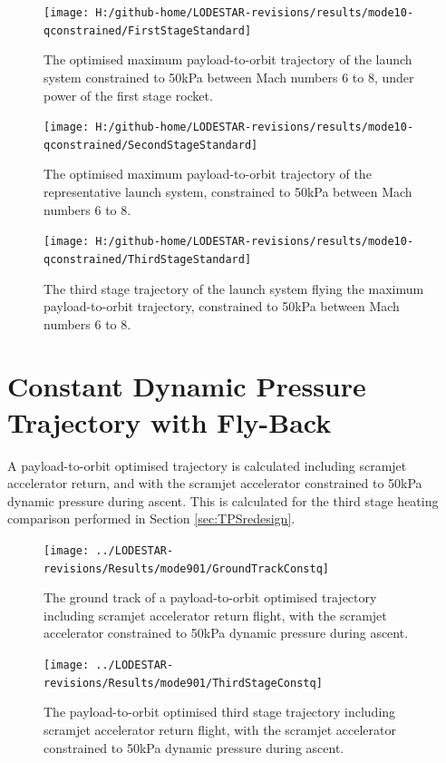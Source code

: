 \begin{figure}[th]
\centering
\texttt{[image: H:/github-home/LODESTAR-revisions/results/mode10-qconstrained/FirstStageStandard]}
\caption{The optimised maximum payload-to-orbit trajectory of the launch system constrained to 50kPa between Mach numbers 6 to 8, under power of the first stage rocket.}
\label{fig:FirstStageqConstrained68}
\end{figure}
		
\begin{figure}[th]
\centering
\texttt{[image: H:/github-home/LODESTAR-revisions/results/mode10-qconstrained/SecondStageStandard]}
\caption{The optimised maximum payload-to-orbit trajectory of the representative launch system, constrained to 50kPa between Mach numbers 6 to 8.}
\label{fig:SecondStageqConstrained68}
\end{figure}

\begin{figure}[th]
\centering
\texttt{[image: H:/github-home/LODESTAR-revisions/results/mode10-qconstrained/ThirdStageStandard]}
\caption{The third stage trajectory of the launch system flying the maximum payload-to-orbit trajectory, constrained to 50kPa between Mach numbers 6 to 8.}
\label{fig:ThirdStageqConstrained68}
\end{figure}






\section{Constant Dynamic Pressure Trajectory with Fly-Back}\label{sec:constqReturn}
A payload-to-orbit optimised trajectory is calculated including scramjet accelerator return, and with the scramjet accelerator constrained to 50kPa dynamic pressure during ascent. This is calculated for the third stage heating comparison performed in Section \ref{sec:TPSredesign}.

\begin{figure}[H]
\centering
\texttt{[image: ../LODESTAR-revisions/Results/mode901/GroundTrackConstq]}
\caption{The ground track of a payload-to-orbit optimised trajectory including scramjet accelerator return flight, with the scramjet accelerator constrained to 50kPa dynamic pressure during ascent.}
\label{fig:GroundTrackConstqReturn}
\end{figure}

\begin{figure}[H]
\centering
\texttt{[image: ../LODESTAR-revisions/Results/mode901/ThirdStageConstq]}
\caption{The payload-to-orbit optimised third stage trajectory including scramjet accelerator return flight, with the scramjet accelerator constrained to 50kPa dynamic pressure during ascent.}
\label{fig:ThirdStageConstqReturn}
\end{figure}



